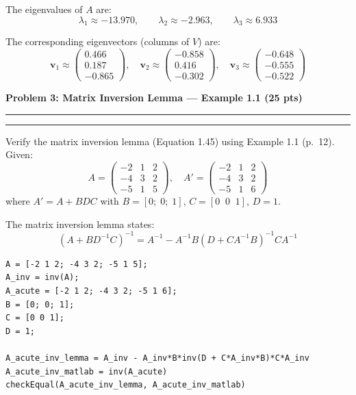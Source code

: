 \documentclass[12pt]{article}
\newcommand{\question}[1]{%
  \clearpage
  \vspace{0.5cm}
  {\noindent\normalsize \textbf{#1}}
  \vspace{0.2cm}
  \hrule
  \vspace{0.1cm}
  \hrule
  \vspace{0.3cm}
}
\begin{document}
\begin{resultsbox}
The eigenvalues of $A$ are:
\[
\lambda_1 \approx -13.970, \qquad \lambda_2 \approx -2.963, \qquad \lambda_3 \approx 6.933
\]

The corresponding eigenvectors (columns of $V$) are:
\[
\mathbf{v}_1 \approx \begin{pmatrix} 0.466 \\ 0.187 \\ -0.865 \end{pmatrix}, \quad
\mathbf{v}_2 \approx \begin{pmatrix} -0.858 \\ 0.416 \\ -0.302 \end{pmatrix}, \quad
\mathbf{v}_3 \approx \begin{pmatrix} -0.648 \\ -0.555 \\ -0.522 \end{pmatrix}
\]
\end{resultsbox}


\question{Problem 3: Matrix Inversion Lemma --- Example 1.1 (25 pts)}\label{prob:3}

Verify the matrix inversion lemma (Equation 1.45) using Example 1.1 (p.\ 12). Given:
\[
A = \begin{pmatrix} -2 & 1 & 2 \\ -4 & 3 & 2 \\ -5 & 1 & 5 \end{pmatrix}, \quad
A' = \begin{pmatrix} -2 & 1 & 2 \\ -4 & 3 & 2 \\ -5 & 1 & 6 \end{pmatrix}
\]
where $A' = A + BDC$ with $B = [0;\; 0;\; 1]$, $C = [0\;\; 0\;\; 1]$, $D = 1$.

The matrix inversion lemma states:
\[
(A + BD^{-1}C)^{-1} = A^{-1} - A^{-1}B(D + CA^{-1}B)^{-1}CA^{-1}
\]

\begin{codebox}
\begin{lstlisting}
A = [-2 1 2; -4 3 2; -5 1 5];
A_inv = inv(A);
A_acute = [-2 1 2; -4 3 2; -5 1 6];
B = [0; 0; 1];
C = [0 0 1];
D = 1;

A_acute_inv_lemma = A_inv - A_inv*B*inv(D + C*A_inv*B)*C*A_inv
A_acute_inv_matlab = inv(A_acute)
checkEqual(A_acute_inv_lemma, A_acute_inv_matlab)
\end{lstlisting}
\end{codebox}
\end{document}
